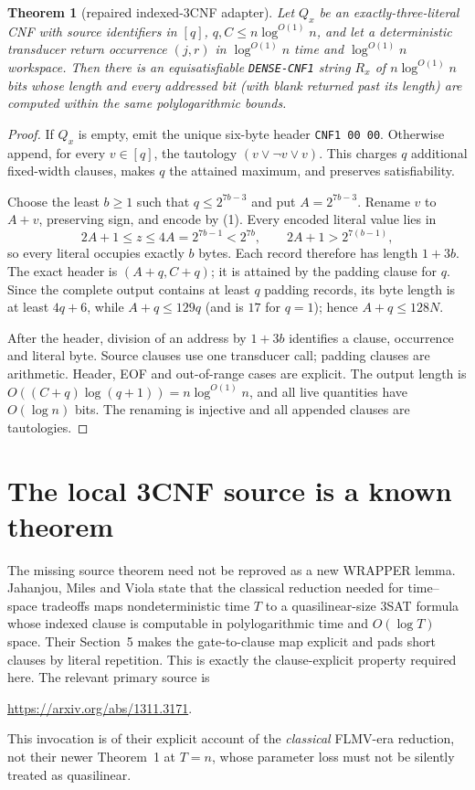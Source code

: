 \documentclass[11pt]{article}
\newtheorem{theorem}{Theorem}
\begin{document}
\begin{theorem}[repaired indexed-3CNF adapter]\label{thm:adapter}
Let $Q_x$ be an exactly-three-literal CNF with source identifiers in $[q]$,
$q,C\le n\log^{O(1)}n$, and let a deterministic transducer return occurrence
$(j,r)$ in $\log^{O(1)}n$ time and $\log^{O(1)}n$ workspace.  Then there is an
equisatisfiable \texttt{DENSE-CNF1} string $R_x$ of
$n\log^{O(1)}n$ bits whose length and every addressed bit (with blank returned
past its length) are computed within the same polylogarithmic bounds.
\end{theorem}
\begin{proof}
If $Q_x$ is empty, emit the unique six-byte header
\texttt{CNF1 00 00}.  Otherwise append, for every $v\in[q]$, the tautology
$(v\vee\neg v\vee v)$.  This charges $q$ additional fixed-width clauses,
makes $q$ the attained maximum, and preserves satisfiability.

Choose the least $b\ge1$ such that $q\le2^{7b-3}$ and put
$A=2^{7b-3}$.  Rename $v$ to $A+v$, preserving sign, and encode by (1).
Every encoded literal value lies in
\[
 2A+1\le z\le4A=2^{7b-1}<2^{7b},
 \qquad 2A+1>2^{7(b-1)},                                   \tag{2}
\]
so every literal occupies exactly $b$ bytes.  Each record therefore has
length $1+3b$.  The exact header is $(A+q,C+q)$; it is attained by the padding
clause for $q$.  Since the complete output contains at least $q$ padding
records, its byte length is at least $4q+6$, while $A+q\le129q$ (and is
$17$ for $q=1$); hence $A+q\le128N$.

After the header, division of an address by $1+3b$ identifies a clause,
occurrence and literal byte.  Source clauses use one transducer call; padding
clauses are arithmetic.  Header, EOF and out-of-range cases are explicit.
The output length is $O((C+q)\log(q+1))=n\log^{O(1)}n$, and all live
quantities have $O(\log n)$ bits.  The renaming is injective and all appended
clauses are tautologies.
\end{proof}

\section{The local 3CNF source is a known theorem}

The missing source theorem need not be reproved as a new WRAPPER lemma.
Jahanjou, Miles and Viola state that the classical reduction needed for
time--space tradeoffs maps nondeterministic time $T$ to a quasilinear-size
3SAT formula whose indexed clause is computable in polylogarithmic time and
$O(\log T)$ space.  Their Section~5 makes the gate-to-clause map explicit and
pads short clauses by literal repetition.  This is exactly the
clause-explicit property required here.  The relevant primary source is
\begin{center}
\url{https://arxiv.org/abs/1311.3171}.
\end{center}
This invocation is of their explicit account of the \emph{classical}
FLMV-era reduction, not their newer Theorem~1 at $T=n$, whose parameter loss
must not be silently treated as quasilinear.
\end{document}
